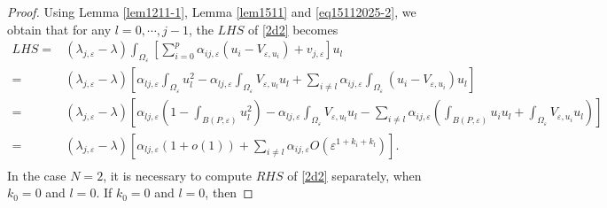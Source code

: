 \documentclass[11pt,reqno]{article}
\numberwithin{equation}{section}
\newcommand\e\varepsilon
\renewcommand\O\Omega
\begin{document}
\begin{proof}
Using  Lemma \ref{lem1211-1}, Lemma \ref{lem1511} and  \eqref{eq15112025-2},  we obtain that for any $l=0,\cdots,j-1$, the $LHS$ of \eqref{2d2} becomes 
\begin{equation}\label{eq0201-1}
            \begin{aligned}
                LHS=&(\lambda_{j,\e}-\lambda)\int_{\O_\e}\left[\sum_{i=0}^{p}\alpha_{ij,\e} (u_i-V_{\e,u_i})+ v_{j,\e}\right]u_l\\
                =&(\lambda_{j,\e}-\lambda)\left[\alpha_{lj,\e}\int_{\O_\e}u_l^2- \alpha_{lj,\e}\int_{\O_\e}V_{\e,u_l}u_l+\sum_{i\neq l}\alpha_{ij,\e} \int_{\O_\e}(u_i-V_{\e,u_i})u_l\right]\\
                =&(\lambda_{j,\e}-\lambda)\left[\alpha_{lj,\e}\left(1-\int_{B(P,\e)}u_l^2\right)- \alpha_{lj,\e}\int_{\O_\e}V_{\e,u_l}u_l-\sum_{i\neq l}\alpha_{ij,\e} \left(\int_{B(P,\e)}u_iu_l+\int_{\O_\e}V_{\e,u_i}u_l\right)\right]\\
                 =&(\lambda_{j,\e}-\lambda)\left[\alpha_{lj,\e}\left(1+o(1)\right)+\sum_{i\neq l}\alpha_{ij,\e} O(\e^{1+{ k_i+k_l}})\right].\\
            \end{aligned}
        \end{equation}
        In the case  $N=2$, it is necessary to compute  $RHS$ of \eqref{2d2} separately, when  $k_0=0$ and $l=0$. If  $k_0=0$ and $l=0$, then

\end{proof}
\end{document}
